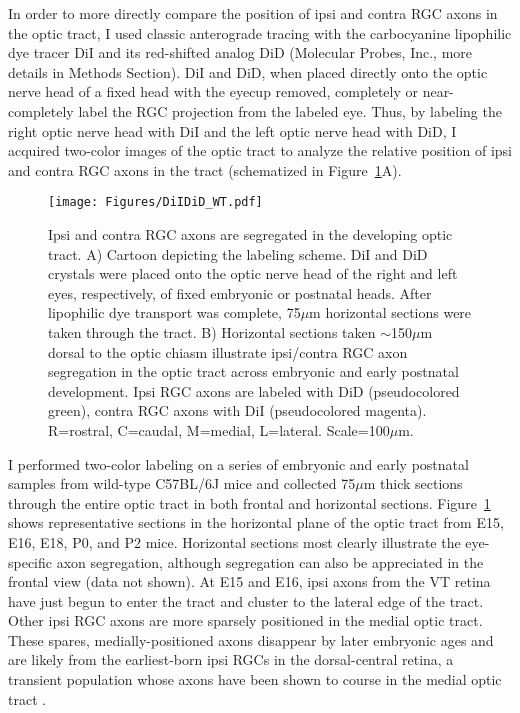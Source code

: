 \label{sec:DiIDiDWT}
In order to more directly compare the position of ipsi and contra RGC axons in the optic tract, I used classic anterograde tracing with the carbocyanine lipophilic dye tracer DiI and its red-shifted analog DiD (Molecular Probes, Inc., more details in Methods Section).
DiI and DiD, when placed directly onto the optic nerve head of a fixed head with the eyecup removed, completely or near-completely label the RGC projection from the labeled eye.
Thus, by labeling the right optic nerve head with DiI and the left optic nerve head with DiD, I acquired two-color images of the optic tract to analyze the relative position of ipsi and contra RGC axons in the tract (schematized in Figure~\ref{Figures/DiIDiDWT}A).

\begin{figure}[hbtp]
    \begin{center}
        \texttt{[image: Figures/DiIDiD\_WT.pdf]}
        \caption[Ipsi and contra RGC axons are segregated in the developing optic tract.]
        {Ipsi and contra RGC axons are segregated in the developing optic tract.
        A) Cartoon depicting the labeling scheme.
        DiI and DiD crystals were placed onto the optic nerve head of the right and left eyes, respectively, of fixed embryonic or postnatal heads.
        After lipophilic dye transport was complete, 75$\mu$m horizontal sections were taken through the tract.
        B) Horizontal sections taken $\sim$150$\mu$m dorsal to the optic chiasm illustrate ipsi/contra RGC axon segregation in the optic tract across embryonic and early postnatal development.
        Ipsi RGC axons are labeled with DiD (pseudocolored green), contra RGC axons with DiI (pseudocolored magenta).
        R=rostral, C=caudal, M=medial, L=lateral.
		Scale=100$\mu$m.}
        \label{Figures/DiIDiDWT}
    \end{center}
\end{figure}

I performed two-color labeling on a series of embryonic and early postnatal samples from wild-type C57BL/6J mice and collected 75$\mu$m thick sections through the entire optic tract in both frontal and horizontal sections.
Figure~\ref{Figures/DiIDiDWT} shows representative sections in the horizontal plane of the optic tract from E15, E16, E18, P0, and P2 mice.
Horizontal sections most clearly illustrate the eye-specific axon segregation, although segregation can also be appreciated in the frontal view (data not shown).
At E15 and E16, ipsi axons from the VT retina have just begun to enter the tract and cluster to the lateral edge of the tract.
Other ipsi RGC axons are more sparsely positioned in the medial optic tract.
These spares, medially-positioned axons disappear by later embryonic ages and are likely from the earliest-born ipsi RGCs in the dorsal-central retina, a transient population \cite{drager1985birth} whose axons have been shown to course in the medial optic tract \cite{soares2015transient}.

